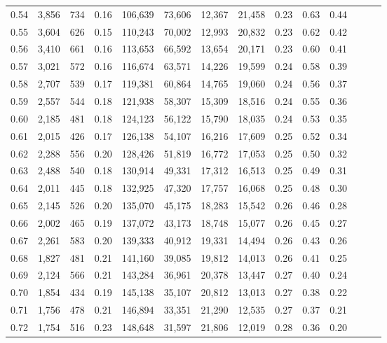 \begin{tabular}{rrrrrrrrrrrrrr}
0.54 &  3,856 &  734 &  0.16 &  106,639 &   73,606 &  12,367 &  21,458 &  0.23 &  0.63 &      0.44 \\
0.55 &  3,604 &  626 &  0.15 &  110,243 &   70,002 &  12,993 &  20,832 &  0.23 &  0.62 &      0.42 \\
0.56 &  3,410 &  661 &  0.16 &  113,653 &   66,592 &  13,654 &  20,171 &  0.23 &  0.60 &      0.41 \\
0.57 &  3,021 &  572 &  0.16 &  116,674 &   63,571 &  14,226 &  19,599 &  0.24 &  0.58 &      0.39 \\
0.58 &  2,707 &  539 &  0.17 &  119,381 &   60,864 &  14,765 &  19,060 &  0.24 &  0.56 &      0.37 \\
0.59 &  2,557 &  544 &  0.18 &  121,938 &   58,307 &  15,309 &  18,516 &  0.24 &  0.55 &      0.36 \\
0.60 &  2,185 &  481 &  0.18 &  124,123 &   56,122 &  15,790 &  18,035 &  0.24 &  0.53 &      0.35 \\
0.61 &  2,015 &  426 &  0.17 &  126,138 &   54,107 &  16,216 &  17,609 &  0.25 &  0.52 &      0.34 \\
0.62 &  2,288 &  556 &  0.20 &  128,426 &   51,819 &  16,772 &  17,053 &  0.25 &  0.50 &      0.32 \\
0.63 &  2,488 &  540 &  0.18 &  130,914 &   49,331 &  17,312 &  16,513 &  0.25 &  0.49 &      0.31 \\
0.64 &  2,011 &  445 &  0.18 &  132,925 &   47,320 &  17,757 &  16,068 &  0.25 &  0.48 &      0.30 \\
0.65 &  2,145 &  526 &  0.20 &  135,070 &   45,175 &  18,283 &  15,542 &  0.26 &  0.46 &      0.28 \\
0.66 &  2,002 &  465 &  0.19 &  137,072 &   43,173 &  18,748 &  15,077 &  0.26 &  0.45 &      0.27 \\
0.67 &  2,261 &  583 &  0.20 &  139,333 &   40,912 &  19,331 &  14,494 &  0.26 &  0.43 &      0.26 \\
0.68 &  1,827 &  481 &  0.21 &  141,160 &   39,085 &  19,812 &  14,013 &  0.26 &  0.41 &      0.25 \\
0.69 &  2,124 &  566 &  0.21 &  143,284 &   36,961 &  20,378 &  13,447 &  0.27 &  0.40 &      0.24 \\
0.70 &  1,854 &  434 &  0.19 &  145,138 &   35,107 &  20,812 &  13,013 &  0.27 &  0.38 &      0.22 \\
0.71 &  1,756 &  478 &  0.21 &  146,894 &   33,351 &  21,290 &  12,535 &  0.27 &  0.37 &      0.21 \\
0.72 &  1,754 &  516 &  0.23 &  148,648 &   31,597 &  21,806 &  12,019 &  0.28 &  0.36 &      0.20 \\

\end{tabular}
